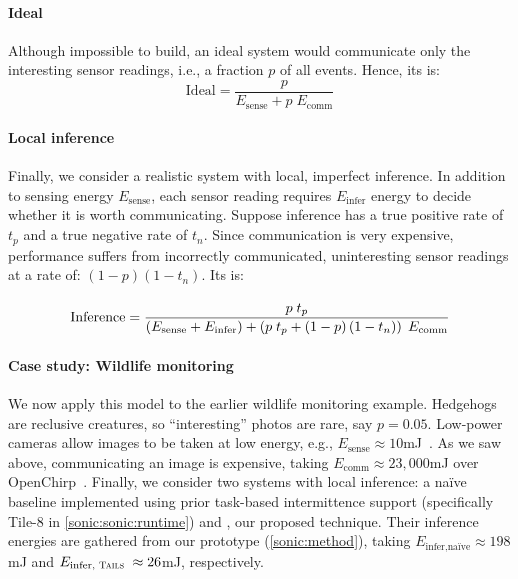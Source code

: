 \tabMotivateModel

\paragraph{Ideal}
%
Although impossible to build, an ideal system would communicate only
the interesting sensor readings, i.e., a fraction $p$ of all events.
%
Hence, its \metric is:
\begin{equation}
  \text{Ideal}
  = \frac{p}{E_\text{sense} + p \; E_\text{comm}}
\end{equation}

\paragraph{Local inference}
%
Finally, we consider a realistic system with local, imperfect inference.
%
In addition to sensing energy $E_\text{sense}$,
each sensor reading requires $E_\text{infer}$ energy to decide whether it is worth communicating.
%
Suppose inference has a true positive rate
of $t_p$ and a true negative rate
of $t_n$.
%
Since communication is very expensive, performance
suffers from incorrectly communicated,
uninteresting sensor readings at a rate of: $\left(1-p\right)\left(1-t_n\right) $.
%
Its \metric is:
\vspace{-1em}
\begin{align}
  \label{eq:impj}
  & \\[-0.85em]
  \text{Inference}
  &= \frac{p \; t_p}{\left(E_\text{sense} + E_\text{infer}\right) + \left(p \; t_p + \left(1-p\right)\left(1-t_n\right)\right) \; E_\text{comm}} \notag
\end{align}

\paragraph{Case study: Wildlife monitoring}
%
We now apply this model to the earlier wildlife monitoring example.
%
Hedgehogs are reclusive creatures, so ``interesting'' photos are rare,
say $p = 0.05$.
%
Low-power cameras allow images to be taken at low energy, e.g.,
$E_\text{sense} \approx 10$mJ~\cite{wispcam}.
%
As we saw above, communicating an image is expensive, taking
$E_\text{comm} \approx 23,\!000$mJ over OpenChirp~\cite{dongare2017openchirp}.
%
Finally, we consider two systems with local inference:
a na\"ive baseline implemented using prior task-based intermittence support (specifically Tile-8 in \autoref{sonic:sonic:runtime})
and \sonictails, our proposed technique.
Their inference energies are gathered from our prototype (\autoref{sonic:method}),
taking $E_\text{infer,na\"ive} \approx 198$mJ and $E_\text{infer,\tails} \approx 26$mJ, respectively.

